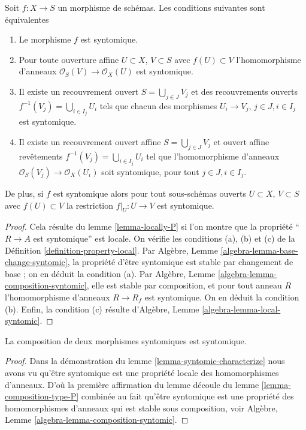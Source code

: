 \begin{lemma}
\label{lemma-syntomic-characterize}
Soit $f : X \to S$ un morphisme de schémas. Les conditions
suivantes sont équivalentes
\begin{enumerate}
\item Le morphisme $f$ est syntomique.
\item Pour toute ouverture affine $U \subset X$, $V \subset S$
avec $f(U) \subset V$ l'homomorphisme
d'anneaux $\mathcal{O}_S(V) \to \mathcal{O}_X(U)$ est syntomique.
\item Il existe un recouvrement ouvert $S = \bigcup_{j \in J} V_j$ et
des recouvrements ouverts $f^{-1}(V_j) = \bigcup_{i \in I_j} U_i$ tels que chacun
des morphismes $U_i \to V_j$, $j\in J, i\in I_j$ est
syntomique.
\item Il existe un recouvrement ouvert affine $S = \bigcup_{j \in J} V_j$
et ouvert affine revêtements $f^{-1}(V_j) = \bigcup_{i \in I_j} U_i$ tel que l'homomorphisme
d'anneaux $\mathcal{O}_S(V_j) \to \mathcal{O}_X(U_i)$ soit syntomique,
pour tout $j\in J, i\in I_j$.
\end{enumerate}
De plus, si $f$ est syntomique
alors pour tout sous-schémas ouverts $U \subset X$, $V \subset S$ avec $f(U) \subset V$
la restriction $f|_U : U \to V$ est syntomique.
\end{lemma}

\begin{proof}
Cela résulte du lemme \ref{lemma-locally-P} si l'on montre que la propriété
``$R \to A$ est syntomique''
est locale. On vérifie les conditions (a), (b)
et (c) de la Définition \ref{definition-property-local}.
Par Algèbre, Lemme \ref{algebra-lemma-base-change-syntomic}, la propriété d'être syntomique est stable
par changement de base ; on en déduit
la condition (a). Par
Algèbre, Lemme \ref{algebra-lemma-composition-syntomic}, elle est stable
par composition, et pour tout anneau $R$ l'homomorphisme
d'anneaux $R \to R_f$ est syntomique.
On en déduit la condition (b). Enfin, la
condition (c) résulte d'Algèbre, Lemme \ref{algebra-lemma-local-syntomic}.
\end{proof}

\begin{lemma}
\label{lemma-composition-syntomic}
La composition de deux morphismes syntomiques est syntomique.
\end{lemma}

\begin{proof}
Dans la démonstration du lemme \ref{lemma-syntomic-characterize} nous avons
vu qu'être syntomique est une propriété locale des homomorphismes
d'anneaux. D'où la première affirmation
du lemme découle du lemme \ref{lemma-composition-type-P} combinée
au fait qu'être syntomique est une propriété des homomorphismes
d'anneaux qui est stable
sous composition, voir Algèbre, Lemme \ref{algebra-lemma-composition-syntomic}.
\end{proof}

